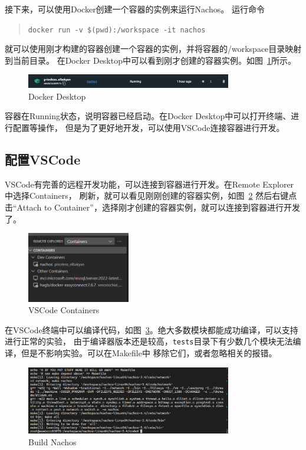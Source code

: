 \documentclass[a4paper,twoside]{article}
\begin{document}
\begin{spacing}{1.2}
接下来，可以使用Docker创建一个容器的实例来运行Nachos。
运行命令
\begin{quotation}
	\texttt{docker run -v \$(pwd):/workspace -it nachos}
\end{quotation}
就可以使用刚才构建的容器创建一个容器的实例，并将容器的/workspace目录映射到当前目录。
在Docker Desktop中可以看到刚才创建的容器实例。如图~\ref{fig:docker}所示。
\begin{figure}[htb]
	\centering
	\includegraphics[width=0.8\textwidth]{images/docker.png}
	\caption{Docker Desktop}
	\label{fig:docker}
\end{figure}
容器在Running状态，说明容器已经启动。在Docker Desktop中可以打开终端、进行配置等操作，
但是为了更好地开发，可以使用VSCode连接容器进行开发。

\subsection{配置VSCode}

VSCode有完善的远程开发功能，可以连接到容器进行开发。在Remote Explorer中选择Containers，
刷新，就可以看见刚刚创建的容器实例，如图~\ref{code:vscodecont}
然后右键点击“Attach to Container”，选择刚才创建的容器实例，就可以连接到容器进行开发了。
\begin{figure}[htb]
	\centering
	\includegraphics[width=0.4\textwidth]{images/vscodecnt.png}
	\caption{VSCode Containers}
	\label{code:vscodecont}
\end{figure}

在VSCode终端中可以编译代码，如图~\ref{fig:build}。绝大多数模块都能成功编译，可以支持进行正常的实验，
由于编译器版本还是较高，\texttt{tests}目录下有少数几个模块无法编译，但是不影响实验。可以在Makefile中
移除它们，或者忽略相关的报错。
\begin{figure}[htb]
	\centering
	\includegraphics[width=0.8\textwidth]{images/build.png}
	\caption{Build Nachos}
	\label{fig:build}
\end{figure}


\end{spacing}
\end{document}
